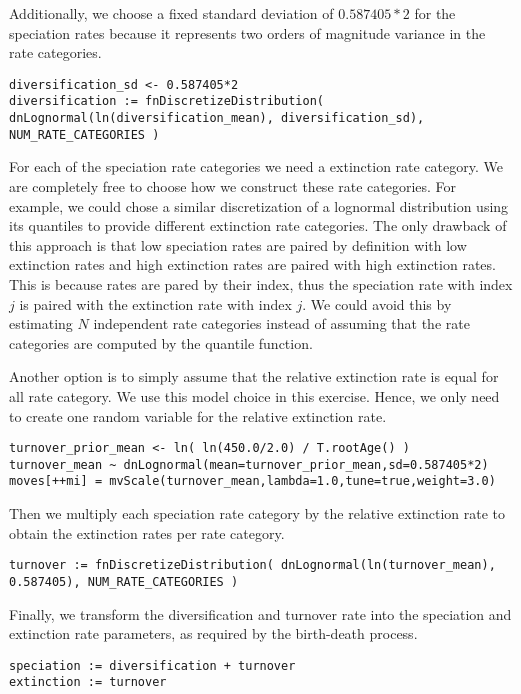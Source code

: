 Additionally, we choose a fixed standard deviation of $0.587405*2$ for the speciation rates because it represents two orders of magnitude variance in the rate categories.
{\tt \begin{snugshade*}
\begin{lstlisting}
diversification_sd <- 0.587405*2
diversification := fnDiscretizeDistribution( dnLognormal(ln(diversification_mean), diversification_sd), NUM_RATE_CATEGORIES )
\end{lstlisting}
\end{snugshade*}}
For each of the speciation rate categories we need a extinction rate category.
We are completely free to choose how we construct these rate categories.
For example, we could chose a similar discretization of a lognormal distribution using its quantiles to provide different extinction rate categories.
The only drawback of this approach is that low speciation rates are paired by definition with low extinction rates and high extinction rates are paired with high extinction rates.
This is because rates are pared by their index, thus the speciation rate with index $j$ is paired with the extinction rate with index $j$.
We could avoid this by estimating $N$ independent rate categories instead of assuming that the rate categories are computed by the quantile function.

Another option is to simply assume that the relative extinction rate is equal for all rate category.
We use this model choice in this exercise.
Hence, we only need to create one random variable for the relative extinction rate.
{\tt \begin{snugshade*}
\begin{lstlisting}
turnover_prior_mean <- ln( ln(450.0/2.0) / T.rootAge() )
turnover_mean ~ dnLognormal(mean=turnover_prior_mean,sd=0.587405*2) 
moves[++mi] = mvScale(turnover_mean,lambda=1.0,tune=true,weight=3.0)
\end{lstlisting}
\end{snugshade*}}
Then we multiply each speciation rate category by the relative extinction rate to obtain the extinction rates per rate category.
{\tt \begin{snugshade*}
\begin{lstlisting}
turnover := fnDiscretizeDistribution( dnLognormal(ln(turnover_mean), 0.587405), NUM_RATE_CATEGORIES )
\end{lstlisting}
\end{snugshade*}}
Finally, we transform the diversification and turnover rate into the speciation and extinction rate parameters, as required by the birth-death process.
{\tt \begin{snugshade*}
\begin{lstlisting}
speciation := diversification + turnover
extinction := turnover 
\end{lstlisting}
\end{snugshade*}}

